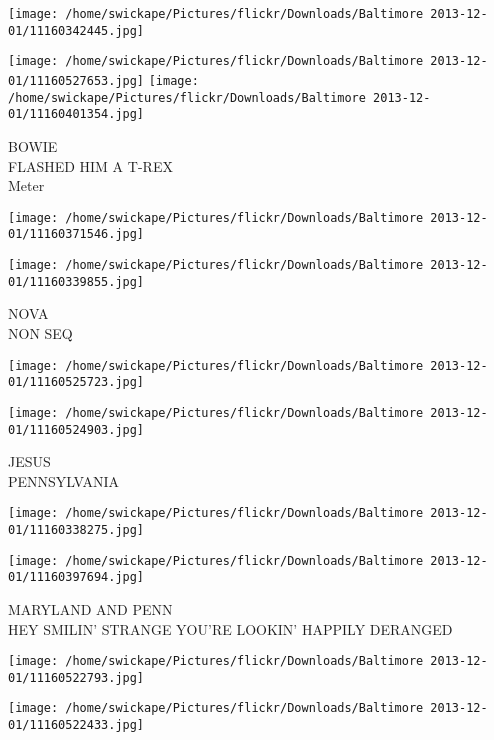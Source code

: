 \documentclass[10pt,letterpaper]{article}
\begin{document}
\texttt{[image: /home/swickape/Pictures/flickr/Downloads/Baltimore 2013-12-01/11160342445.jpg]}

\vspace{0.25in}
\texttt{[image: /home/swickape/Pictures/flickr/Downloads/Baltimore 2013-12-01/11160527653.jpg]}
\texttt{[image: /home/swickape/Pictures/flickr/Downloads/Baltimore 2013-12-01/11160401354.jpg]}

BOWIE\\
FLASHED HIM A T{-}REX\\
Meter\\
\pagebreak

\texttt{[image: /home/swickape/Pictures/flickr/Downloads/Baltimore 2013-12-01/11160371546.jpg]}

\vspace{0.25in}
\texttt{[image: /home/swickape/Pictures/flickr/Downloads/Baltimore 2013-12-01/11160339855.jpg]}

NOVA\\
NON SEQ\\
\pagebreak

\texttt{[image: /home/swickape/Pictures/flickr/Downloads/Baltimore 2013-12-01/11160525723.jpg]}

\vspace{0.25in}
\texttt{[image: /home/swickape/Pictures/flickr/Downloads/Baltimore 2013-12-01/11160524903.jpg]}

JESUS\\
PENNSYLVANIA\\
\pagebreak

\texttt{[image: /home/swickape/Pictures/flickr/Downloads/Baltimore 2013-12-01/11160338275.jpg]}

\vspace{0.25in}
\texttt{[image: /home/swickape/Pictures/flickr/Downloads/Baltimore 2013-12-01/11160397694.jpg]}

MARYLAND AND PENN\\
HEY SMILIN' STRANGE YOU'RE LOOKIN' HAPPILY DERANGED\\
\pagebreak

\texttt{[image: /home/swickape/Pictures/flickr/Downloads/Baltimore 2013-12-01/11160522793.jpg]}

\vspace{0.25in}
\texttt{[image: /home/swickape/Pictures/flickr/Downloads/Baltimore 2013-12-01/11160522433.jpg]}
\end{document}
